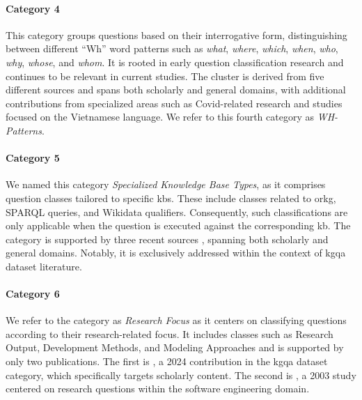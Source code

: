 \label{enum:cluster_4}
\paragraph{Category 4} This category groups questions based on their interrogative form, distinguishing between different \enquote{Wh} word patterns such as \emph{what}, \emph{where}, \emph{which}, \emph{when}, \emph{who}, \emph{why}, \emph{whose}, and \emph{whom}. It is rooted in early question classification research and continues to be relevant in current studies. The cluster is derived from five different sources \cite{auer_sciqa_2023,riloff_rule-based_2000,tran_comparative_2022,nguyen_ripple_2017,moldovan_structure_2000} and spans both scholarly and general domains, with additional contributions from specialized areas such as Covid-related research and studies focused on the Vietnamese language. We refer to this fourth category as \emph{WH-Patterns}.

\label{enum:cluster_5}
\paragraph{Category 5} We named this category \emph{Specialized Knowledge Base Types}, as it comprises question classes tailored to specific \glspl{kb}. These include classes related to \gls{orkg}, SPARQL queries, and Wikidata qualifiers. Consequently, such classifications are only applicable when the question is executed against the corresponding \gls{kb}. The category is supported by three recent sources \cite{auer_sciqa_2023,steinmetz_what_2021,dubey_lc-quad_2019}, spanning both scholarly and general domains. Notably, it is exclusively addressed within the context of \gls{kgqa} dataset literature.

\label{enum:cluster_6}
\paragraph{Category 6} We refer to the category as \emph{Research Focus} as it centers on classifying questions according to their research-related focus. It includes classes such as Research Output, Development Methods, and Modeling Approaches and is supported by only two publications. The first is \cite{taffa_hybrid-squad_2024}, a 2024 contribution in the \gls{kgqa} dataset category, which specifically targets scholarly content. The second is \cite{shaw_writing_2003}, a 2003 study centered on research questions within the software engineering domain.

